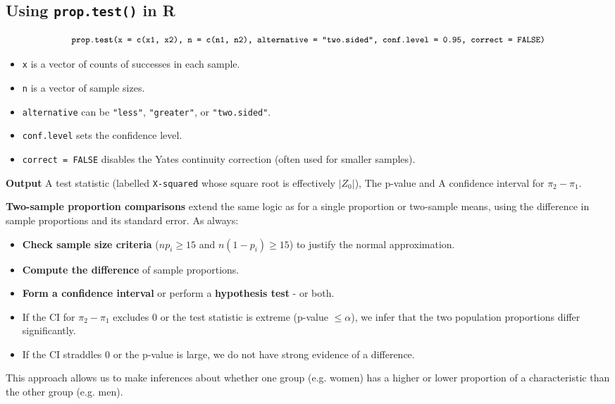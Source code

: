\documentclass[10pt]{extarticle}
\begin{document}
\subsection{Using \texttt{prop.test()} in R}
$$\small\texttt{prop.test(x = c(x1, x2), n = c(n1, n2), alternative = "two.sided", conf.level = 0.95, correct = FALSE)}$$

\begin{itemize}
    \item \texttt{x} is a vector of counts of successes in each sample.
    \item \texttt{n} is a vector of sample sizes.
    \item \texttt{alternative} can be \texttt{"less"}, \texttt{"greater"}, or \texttt{"two.sided"}.
    \item \texttt{conf.level} sets the confidence level.
    \item \texttt{correct = FALSE} disables the Yates continuity correction (often used for smaller samples).
\end{itemize}

\textbf{Output} A test statistic (labelled \texttt{X-squared} whose square root is effectively $\lvert Z_0\rvert$), The p-value and A confidence interval for $\pi_2 - \pi_1$.

\begin{takeaway-box}{}{}
\small
\textbf{Two-sample proportion comparisons} extend the same logic as for a single proportion or two-sample means, using the difference in sample proportions and its standard error. As always:
\begin{itemize}
    \item \textbf{Check sample size criteria} ($n p_i \ge 15$ and $n (1-p_i) \ge 15$) to justify the normal approximation.
    \item \textbf{Compute the difference} of sample proportions.
    \item \textbf{Form a confidence interval} or perform a \textbf{hypothesis test} - or both.
    \item If the CI for $\pi_2 - \pi_1$ excludes 0 or the test statistic is extreme (p-value $\le \alpha$), we infer that the two population proportions differ significantly.
    \item If the CI straddles 0 or the p-value is large, we do not have strong evidence of a difference.
\end{itemize}
This approach allows us to make inferences about whether one group (e.g. women) has a higher or lower proportion of a characteristic than the other group (e.g. men).
\end{takeaway-box}
\end{document}
